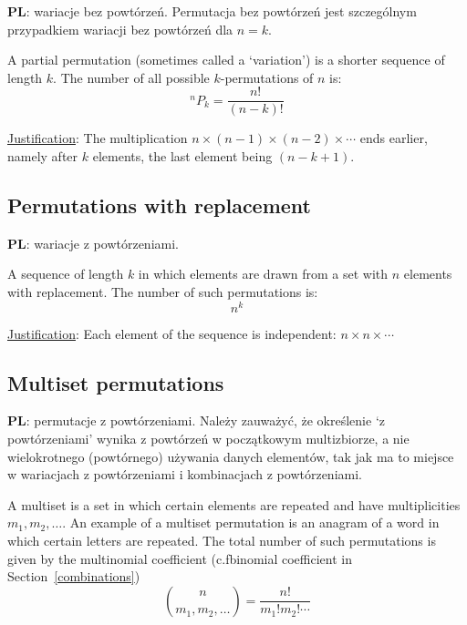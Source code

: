 \documentclass{article}
\makeatletter
\newcommand*{\cf}{c.f\@ifnextchar{.}{}{.\@\xspace}}
\newcommand{\pl}{\textbf{PL}: }
\makeatother
\begin{document}
\foreignlanguage{polish}{\pl wariacje bez powtórzeń.
Permutacja bez powtórzeń jest szczególnym przypadkiem wariacji bez powtórzeń dla $n=k$.}

A partial permutation (sometimes called a `variation') is a shorter sequence of length $k$.
The number of all possible $k$\nobreakdash-\hspace{0pt}permutations of $n$ is:
%
\begin{equation}
    ^nP_k = \frac{n!}{(n-k)!}
\end{equation}

\underline{Justification}:
The multiplication ${n\times(n-1)\times(n-2)\times \dotsb}$ ends earlier, namely after $k$ elements, the last element being $(n-k+1)$.


\subsection{Permutations with replacement}

\foreignlanguage{polish}{\pl wariacje z powtórzeniami.}

A sequence of length $k$ in which elements are drawn from a set with $n$ elements with replacement.
The number of such permutations is:
%
\begin{equation}
    n^k
\end{equation}

\underline{Justification}:
Each element of the sequence is independent: $n\times n\times \dotsb$

\subsection{Multiset permutations}
\label{mulper}

\foreignlanguage{polish}{\pl permutacje z powtórzeniami.
Należy zauważyć, że określenie `z powtórzeniami' wynika z powtórzeń w początkowym multizbiorze, a nie wielokrotnego (powtórnego) używania danych elementów, tak jak ma to miejsce w wariacjach z powtórzeniami i kombinacjach z powtórzeniami.}

A multiset is a set in which certain elements are repeated and have multiplicities $m_1, m_2, \dotsc$.
An example of a multiset permutation is an anagram of a word in which certain letters are repeated.
The total number of such permutations is given by the multinomial coefficient (\cf binomial coefficient in Section~\ref{combinations})
%
\begin{equation}
    \binom{n}{m_1, m_2, \dotsc} = \frac{n!}{m_1!m_2!\dotsm}
\end{equation}
\end{document}
